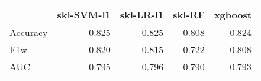 \begin{tabular}{lrrrr}
\toprule
{} &  skl-SVM-l1 &  skl-LR-l1 &  skl-RF &  xgboost \\
\midrule
Accuracy &       0.825 &      0.825 &   0.808 &    0.824 \\
F1w      &       0.820 &      0.815 &   0.722 &    0.808 \\
AUC      &       0.795 &      0.796 &   0.790 &    0.793 \\
\bottomrule
\end{tabular}

